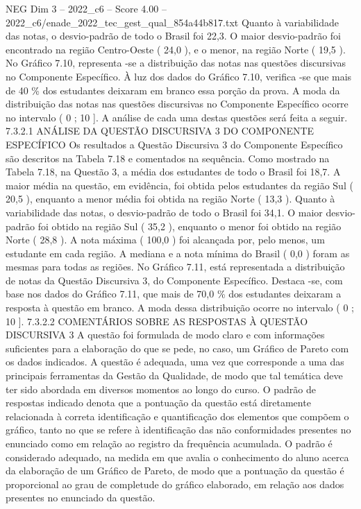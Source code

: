 \begin{textsample}{NEG Dim 3 – 2022\_c6 – Score 4.00 – 2022\_c6/enade\_2022\_tec\_gest\_qual\_854a44b817.txt}
Quanto à variabilidade das notas, o desvio-padrão de todo o Brasil foi 22,3.
O maior desvio-padrão foi encontrado na região Centro-Oeste ( 24,0 ), e o menor, na região Norte ( 19,5 ).
No Gráfico 7.10, representa -se a distribuição das notas nas questões discursivas no Componente Específico.
À luz dos dados do Gráfico 7.10, verifica -se que mais de 40 \% dos estudantes deixaram em branco essa porção da prova.
A moda da distribuição das notas nas questões discursivas no Componente Específico ocorre no intervalo ( 0 ; 10 ].
A análise de cada uma destas questões será feita a seguir. 7.3.2.1 ANÁLISE DA QUESTÃO DISCURSIVA 3 DO COMPONENTE ESPECÍFICO Os resultados a Questão Discursiva 3 do Componente Específico são descritos na Tabela 7.18 e comentados na sequência.
Como mostrado na Tabela 7.18, na Questão 3, a média dos estudantes de todo o Brasil foi 18,7.
A maior média na questão, em evidência, foi obtida pelos estudantes da região Sul ( 20,5 ), enquanto a menor média foi obtida na região Norte ( 13,3 ).
Quanto à variabilidade das notas, o desvio-padrão de todo o Brasil foi 34,1.
O maior desvio-padrão foi obtido na região Sul ( 35,2 ), enquanto o menor foi obtido na região Norte ( 28,8 ).
A nota máxima ( 100,0 ) foi alcançada por, pelo menos, um estudante em cada região.
A mediana e a nota mínima do Brasil ( 0,0 ) foram as mesmas para todas as regiões.
No Gráfico 7.11, está representada a distribuição de notas da Questão Discursiva 3, do Componente Específico.
Destaca -se, com base nos dados do Gráfico 7.11, que mais de 70,0 \% dos estudantes deixaram a resposta à questão em branco.
A moda dessa distribuição ocorre no intervalo ( 0 ; 10 ]. 7.3.2.2 COMENTÁRIOS SOBRE AS RESPOSTAS À QUESTÃO DISCURSIVA 3 A questão foi formulada de modo claro e com informações suficientes para a elaboração do que se pede, no caso, um Gráfico de Pareto com os dados indicados.
A questão é adequada, uma vez que corresponde a uma das principais ferramentas da Gestão da Qualidade, de modo que tal temática deve ter sido abordada em diversos momentos ao longo do curso.
O padrão de respostas indicado denota que a pontuação da questão está diretamente relacionada à correta identificação e quantificação dos elementos que compõem o gráfico, tanto no que se refere à identificação das não conformidades presentes no enunciado como em relação ao registro da frequência acumulada.
O padrão é considerado adequado, na medida em que avalia o conhecimento do aluno acerca da elaboração de um Gráfico de Pareto, de modo que a pontuação da questão é proporcional ao grau de completude do gráfico elaborado, em relação aos dados presentes no enunciado da questão.

\end{textsample}
